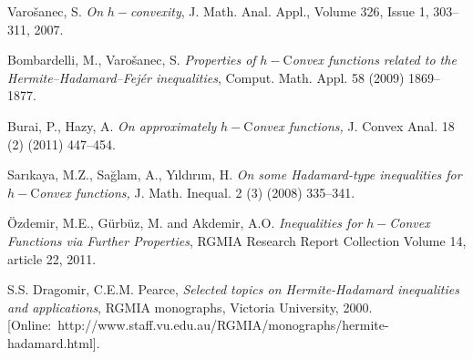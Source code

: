 \documentclass{amsart}
\theoremstyle{plain}
\numberwithin{equation}{section}
\begin{document}
\begin{thebibliography}{99}
 \label{var}Varo\v{s}anec, S. \textit{On }$h-$\textit{convexity},
J. Math. Anal. Appl., Volume 326, Issue 1, 303--311, 2007.

 \label{bom}Bombardelli, M., Varo\v{s}anec, S. \textit{Properties of }$h-$C\textit{onvex functions related to the
Hermite--Hadamard--Fej\'{e}r inequalities}, Comput. Math. Appl. 58 (2009)
1869--1877.

 \label{bura}Burai, P., Hazy, A. \textit{On approximately }$h-$C\textit{onvex functions,} J. Convex Anal. 18 (2) (2011) 447--454.

 \label{sari}Sar\i kaya, M.Z., Sa\u{g}lam, A., Y\i ld\i r\i m,
H. \textit{On some Hadamard-type inequalities for }$h-$C\textit{onvex
functions,} J. Math. Inequal. 2 (3) (2008) 335--341.

 \label{oz}\"{O}zdemir, M.E., G\"{u}rb\"{u}z, M. and Akdemir,
A.O. \textit{Inequalities for }$h-$\textit{Convex Functions via Further
Properties}, RGMIA Research Report Collection Volume 14, article 22, 2011.

 S.S. Dragomir, C.E.M. Pearce, \textit{Selected topics on
Hermite-Hadamard inequalities and applications}, RGMIA monographs, Victoria
University, 2000. [Online:\
http://www.staff.vu.edu.au/RGMIA/monographs/hermite-hadamard.html].
\end{thebibliography}
\end{document}

